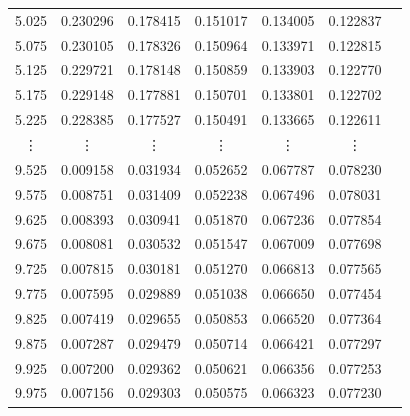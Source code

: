 \documentclass[a4j, titlepage]{jsarticle}
\numberwithin{equation}{section}
\begin{document}
\begin{table}[h]
\begin{tabular}{ccccccc}
                    5.025 & 0.230296 & 0.178415 & 0.151017 & 0.134005 & 0.122837 \\
                    5.075 & 0.230105 & 0.178326 & 0.150964 & 0.133971 & 0.122815 \\
                    5.125 & 0.229721 & 0.178148 & 0.150859 & 0.133903 & 0.122770 \\
                    5.175 & 0.229148 & 0.177881 & 0.150701 & 0.133801 & 0.122702 \\
                    5.225 & 0.228385 & 0.177527 & 0.150491 & 0.133665 & 0.122611 \\
                    \vdots & \vdots & \vdots & \vdots & \vdots & \vdots \vspace{1mm} \\
                    9.525 & 0.009158 & 0.031934 & 0.052652 & 0.067787 & 0.078230 \\
                    9.575 & 0.008751 & 0.031409 & 0.052238 & 0.067496 & 0.078031 \\
                    9.625 & 0.008393 & 0.030941 & 0.051870 & 0.067236 & 0.077854 \\
                    9.675 & 0.008081 & 0.030532 & 0.051547 & 0.067009 & 0.077698 \\
                    9.725 & 0.007815 & 0.030181 & 0.051270 & 0.066813 & 0.077565 \\
                    9.775 & 0.007595 & 0.029889 & 0.051038 & 0.066650 & 0.077454 \\
                    9.825 & 0.007419 & 0.029655 & 0.050853 & 0.066520 & 0.077364 \\
                    9.875 & 0.007287 & 0.029479 & 0.050714 & 0.066421 & 0.077297 \\
                    9.925 & 0.007200 & 0.029362 & 0.050621 & 0.066356 & 0.077253 \\
                    9.975 & 0.007156 & 0.029303 & 0.050575 & 0.066323 & 0.077230 \\
                    \hline																	
                    \end{tabular}
            \end{table}
\end{document}
